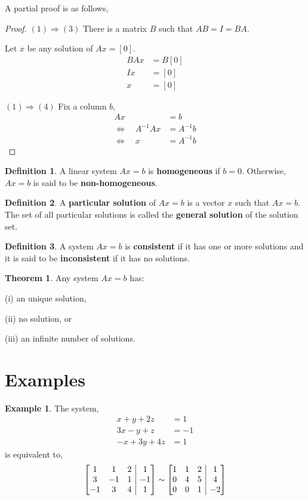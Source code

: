 \documentclass{report}
\makeatletter
\newenvironment{amatrix}[1]{%
  \left[\begin{array}{@{}*{#1}{c}|c@{}}
}{%
  \end{array}\right]
}
\theoremstyle{definition}
\newtheorem*{_def}{Definition}
\newtheorem{_thm}{Theorem}[section]
\newtheorem{ex}{Example}[section]
\theoremstyle{remark}
\makeatother
\begin{document}
A partial proof is as follows,
\begin{proof}
$(1)\Rightarrow (3)$ There is a matrix $B$ such that $AB=I=BA$.

Let $x$ be any solution of $Ax=[0]$.
\begin{align*}
BAx &= B[0] \\
Ix &= [0] \\
x &= [0]
\end{align*}

$(1)\Rightarrow (4)$ Fix a column $b$,
\begin{align*}
Ax &= b \\
\Leftrightarrow \quad A^{-1}Ax &= A^{-1}b \\
\Leftrightarrow \quad x &= A^{-1}b
\end{align*}
\end{proof}

\begin{_def}
A linear system $Ax=b$ is \textbf{homogeneous} if $b=0$.
Otherwise, $Ax=b$ is said to be \textbf{non-homogeneous}.
\end{_def}

\begin{_def}
A \textbf{particular solution} of $Ax=b$ is a vector $x$ such that $Ax=b$.
The set of all particular solutions is called the \textbf{general solution} of the solution set.
\end{_def}

\begin{_def}
A system $Ax=b$ is \textbf{consistent} if it has one or more solutions and it is said to be \textbf{inconsistent} if it has no solutions.
\end{_def}

\begin{_thm}
Any system $Ax=b$ has:

(i) an unique solution, 

(ii) no solution, or

(iii) an infinite number of solutions.
\end{_thm}

\section{Examples}

\begin{ex}
The system,
\begin{align*}
x+y+2z&=1 \\
3x-y+z&=-1 \\
-x+3y+4z&=1
\end{align*}
is equivalent to,
\[
\begin{amatrix}{3}
   1 & 1 & 2 & 1 \\
   3 & -1 & 1 & -1 \\
   -1 & 3 & 4 & 1
\end{amatrix}\sim
\begin{amatrix}{3}
   1 & 1 & 2 & 1 \\
   0 & 4 & 5 & 4 \\
   0 & 0 & 1 & -2
\end{amatrix}\]
\end{ex}
\end{document}
